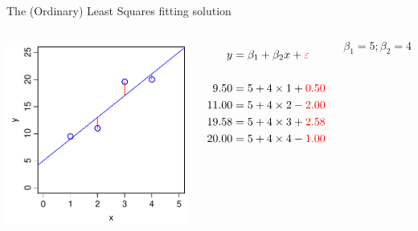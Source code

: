 \documentclass[xcolor=x11names,compress]{beamer}
\renewcommand{\(}{\begin{columns}}
\renewcommand{\)}{\end{columns}}
\newcommand{\<}[1]{\begin{column}{#1}}
\renewcommand{\>}{\end{column}}
\begin{document}
\begin{frame}{The (Ordinary) Least Squares fitting solution}

\begin{columns}[T]

		\includegraphics[width=\textwidth]{JustRight.pdf}
		
		\begin{align*}
		  y  &= \beta_1 + \beta_2 x  + {\color{red} \varepsilon }\\
		  \\
		  9.50  &= 5 + 4 \times 1 + {\color{red} 0.50}\\
		  11.00 &= 5 + 4 \times 2 - {\color{red} 2.00}\\
		  19.58 &= 5 + 4 \times 3 + {\color{red} 2.58}\\
		  20.00 &= 5 + 4 \times 4 - {\color{red} 1.00} 
		\end{align*}
		
		\[\beta_1 = 5; \beta_2=4\]
				
\end{columns}		
\end{frame}

\end{document}
